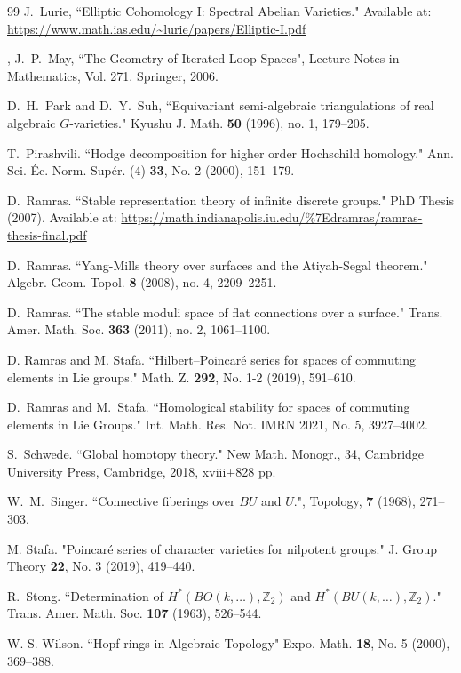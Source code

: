 \documentclass[oneside, a4paper, 12pt]{article}
\numberwithin{equation}{section}
\newcommand{\Z}{\mathbb{Z}}
\theoremstyle{plain}
\theoremstyle{definition}
\theoremstyle{remark}
\begin{document}
\begin{thebibliography}{99}
 J.~Lurie, ``Elliptic Cohomology I: Spectral Abelian Varieties." Available at: \url{https://www.math.ias.edu/~lurie/papers/Elliptic-I.pdf}

, J.~P.~May, ``The Geometry of Iterated Loop Spaces", Lecture Notes in Mathematics, Vol. 271. Springer, 2006.

 D.~H.~Park and D.~Y.~Suh, ``Equivariant semi-algebraic triangulations of real algebraic $G$-varieties." Kyushu J. Math. {\bf 50} (1996), no. 1, 179--205.

 T.~Pirashvili. ``Hodge decomposition for higher order Hochschild homology." Ann. Sci. {\'E}c. Norm.  Sup{\'e}r. (4) {\bf 33}, No. 2 (2000), 151--179.

 D.~Ramras. ``Stable representation theory of infinite discrete groups." PhD Thesis (2007). Available at: \url{https://math.indianapolis.iu.edu/\%7Edramras/ramras-thesis-final.pdf}

 D.~Ramras. ``Yang-Mills theory over surfaces and the Atiyah-Segal theorem." Algebr. Geom. Topol. {\bf 8} (2008), no. 4, 2209--2251.

 D.~Ramras. ``The stable moduli space of flat connections over a surface." Trans. Amer. Math. Soc. {\bf 363} (2011), no. 2, 1061--1100.

 D. Ramras and M. Stafa. ``Hilbert–Poincar{\'e} series for spaces of commuting elements in Lie groups." Math. Z. {\bf 292}, No. 1-2 (2019), 591--610.

 D.~Ramras and M.~Stafa. ``Homological stability for spaces of commuting elements in Lie Groups." Int. Math. Res. Not. IMRN 2021, No. 5, 3927--4002.

 S.~Schwede. ``Global homotopy theory." New Math. Monogr., 34, Cambridge University Press, Cambridge, 2018, xviii+828 pp.

 W.~M.~Singer. ``Connective fiberings over $BU$ and $U$.", Topology, {\bf 7} (1968), 271--303.

 M. Stafa. "Poincaré series of character varieties for nilpotent groups." J. Group Theory {\bf 22}, No. 3 (2019), 419--440.

 R.~Stong. ``Determination of $H^\ast(BO(k,\dots),\Z_2)$ and $H^\ast(BU(k,\dots),\Z_2)$." Trans. Amer. Math. Soc. {\bf 107} (1963), 526--544.

 W. S. Wilson. ``Hopf rings in Algebraic Topology" Expo. Math. {\bf 18}, No. 5 (2000), 369--388.

\end{thebibliography}
\end{document}
